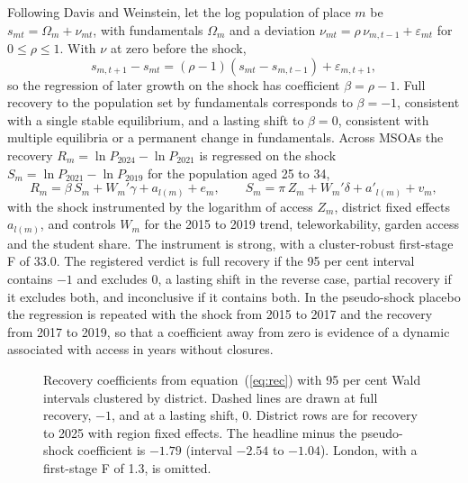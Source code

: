 \documentclass[11pt,a4paper]{article}
\begin{document}
Following Davis and Weinstein, let the log population of place $m$ be $s_{mt} = \Omega_m + \nu_{mt}$, with fundamentals $\Omega_m$ and a deviation $\nu_{mt} = \rho\, \nu_{m,t-1} + \varepsilon_{mt}$ for $0 \le \rho \le 1$. With $\nu$ at zero before the shock,
\begin{equation}\label{eq:dw}
s_{m,t+1} - s_{mt} = (\rho - 1)(s_{mt} - s_{m,t-1}) + \varepsilon_{m,t+1},
\end{equation}
so the regression of later growth on the shock has coefficient $\beta = \rho - 1$. Full recovery to the population set by fundamentals corresponds to $\beta = -1$, consistent with a single stable equilibrium, and a lasting shift to $\beta = 0$, consistent with multiple equilibria or a permanent change in fundamentals. Across MSOAs the recovery $R_m = \ln P_{2024} - \ln P_{2021}$ is regressed on the shock $S_m = \ln P_{2021} - \ln P_{2019}$ for the population aged 25 to 34,
\begin{equation}\label{eq:rec}
R_m = \beta\, S_m + W_m' \gamma + a_{l(m)} + e_m, \qquad S_m = \pi\, Z_m + W_m' \delta + a'_{l(m)} + v_m,
\end{equation}
with the shock instrumented by the logarithm of access $Z_m$, district fixed effects $a_{l(m)}$, and controls $W_m$ for the 2015 to 2019 trend, teleworkability, garden access and the student share. The instrument is strong, with a cluster-robust first-stage F of 33.0. The registered verdict is full recovery if the 95 per cent interval contains $-1$ and excludes 0, a lasting shift in the reverse case, partial recovery if it excludes both, and inconclusive if it contains both. In the pseudo-shock placebo the regression is repeated with the shock from 2015 to 2017 and the recovery from 2017 to 2019, so that a coefficient away from zero is evidence of a dynamic associated with access in years without closures.

\begin{figure}[htbp]
\centering
{}
\caption{Recovery coefficients from equation~(\ref{eq:rec}) with 95 per cent Wald intervals clustered by district. Dashed lines are drawn at full recovery, $-1$, and at a lasting shift, 0. District rows are for recovery to 2025 with region fixed effects. The headline minus the pseudo-shock coefficient is $-1.79$ (interval $-2.54$ to $-1.04$). London, with a first-stage F of 1.3, is omitted.}\label{fig:rec}
\end{figure}
\end{document}

